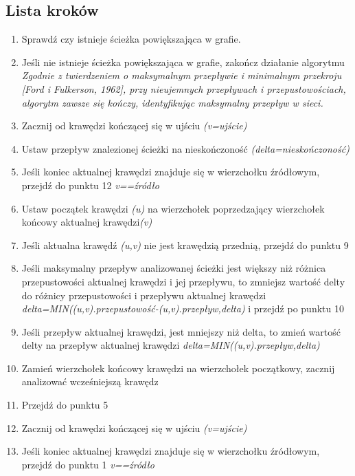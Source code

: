 \documentclass[10pt]{minutes}
\begin{document}
  \subsection{Lista kroków}
    \begin{enumerate}
    \item{Sprawdź czy istnieje ścieżka powiększająca w grafie.}
    \item{Jeśli nie istnieje ścieżka powiększająca w grafie, zakończ działanie algorytmu}\\
      \emph{Zgodnie z twierdzeniem o maksymalnym przepływie i minimalnym przekroju [Ford i Fulkerson, 1962], przy nieujemnych przepływach i przepustowościach, algorytm zawsze się kończy, identyfikując maksymalny przepływ w sieci.}
    \item{Zacznij od krawędzi kończącej się w ujściu \emph{(v=ujście)}}
    \item{Ustaw przepływ znalezionej ścieżki na nieskończoność \emph{(delta=nieskończoność)}}
    \item{Jeśli koniec aktualnej krawędzi znajduje się w wierzchołku źródłowym, przejdź do punktu 12 \emph{v==źródło}}
    \item{Ustaw początek krawędzi \emph{(u)} na wierzchołek poprzedzający wierzchołek końcowy aktualnej krawędzi\emph{(v)}}
    \item{Jeśli aktualna krawędź \emph{(u,v)} nie jest krawędzią przednią, przejdź do punktu 9}
    \item{Jeśli maksymalny przepływ analizowanej ścieżki jest większy niż różnica przepustowości aktualnej krawędzi i jej przepływu, to zmniejsz wartość delty do różnicy przepustowości i przepływu aktualnej krawędzi 
      \emph{delta=MIN((u,v).przepustowość-(u,v).przepływ,delta)} i przejdź po punktu 10}
    \item{Jeśli przepływ aktualnej krawędzi, jest mniejszy niż delta, to zmień wartość delty na przepływ aktualnej krawędzi \emph{delta=MIN((u,v).przepływ,delta)}}
    \item{Zamień wierzchołek końcowy krawędzi na wierzchołek początkowy, zacznij analizować wcześniejszą krawędz}
    \item{Przejdź do punktu 5}
    \item{Zacznij od krawędzi kończącej się w ujściu \emph{(v=ujście)}}
    \item{Jeśli koniec aktualnej krawędzi znajduje się w wierzchołku źródłowym, przejdź do punktu 1 \emph{v==źródło}}

\end{enumerate}
\end{document}

